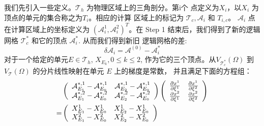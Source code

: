 \documentclass{report}
\theoremstyle{Remark}
\begin{document}
     我们先引入一些定义。$\mathcal{T}_h$ 为物理区域上的三角剖分。第i个
     点定义为$X_i$，以$X_i$ 为顶点的单元的集合称之为$T_i$。相应的计算
     区域上的标记为 $\mathcal{T}_c, \mathcal{A}_i$ 和 $T_{i,c}$。
     $\mathcal{A}_i$ 点在计算区域上的坐标定义为 $(\mathcal{A}_i^1,
     \mathcal{A}_i^2)^T$。在 Step 1 结束后，我们得到了新的逻辑网格
     $\mathcal{T}_c^*$ 和它的顶点 $\mathcal{A}_i^*$. 从而我们得到新旧
     逻辑网格的差:
     \begin{equation}
       \delta \mathcal{A}_i  = \mathcal{A}^{(0)} - \mathcal{A}_i^*
     \end{equation}
     对于一个给定的单元$E \in \mathcal{T}_h$, $X_{E_k}, 0 \leq k \leq
     2 $, 作为它的三个顶点。从$V_{\mathcal{T}_c^*}(\Omega)$ 到
     $V_{\mathcal{T}}(\Omega)$ 的分片线性映射在单元 $E$ 上的梯度是常数，
     并且满足下面的方程组：
     \begin{eqnarray}
       \begin{aligned}
        & \left (
           \begin{array}{cc}
             \mathcal{A}_{E_1}^{*, 1} - \mathcal{A}_{E_0}^{*, 1} & 
             \mathcal{A}_{E_2}^{*, 1} - \mathcal{A}_{E_0}^{*, 1} \\
             \mathcal{A}_{E_1}^{*, 2} - \mathcal{A}_{E_0}^{*, 2} &
             \mathcal{A}_{E_2}^{*, 2} - \mathcal{A}_{E_0}^{*, 2} 
           \end{array} 
         \right )
         \left (
           \begin{array}{cc}
             \frac{\partial x^1}{\partial \xi^1} & \frac{\partial
               x^1}{\partial \xi^2} \\
             \frac{\partial x^2}{\partial
               \xi^1} & \frac{\partial x^2}{\partial \xi^2}
           \end{array}
         \right ) \notag \\ = & 
         \left (
           \begin{array}{ll}
             X_{E_1}^1 - X_{E_0}^1 & X_{E_2}^1 - X_{E_0}^1 \\
             X_{E_1}^2 - X_{E_0}^2 & X_{E_2}^2 - X_{E_0}^2 
           \end{array}
         \right )
       \end{aligned}
     \end{eqnarray}
\end{document}
